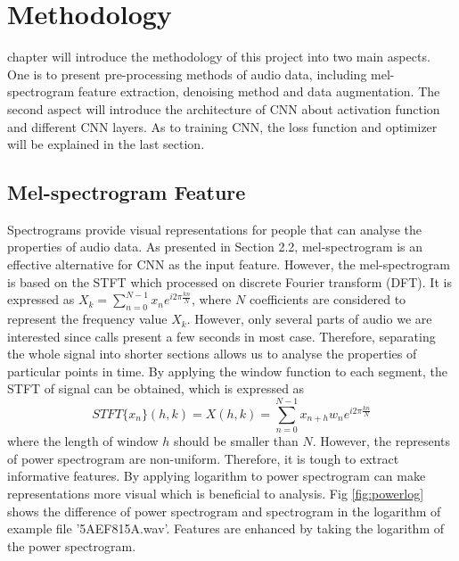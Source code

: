 \chapter{Methodology}
\renewcommand{\baselinestretch}{\mystretch}
\label{chap:method}
 chapter will introduce the methodology of this project into two main aspects. One is to present pre-processing methods of audio data, including mel-spectrogram feature extraction, denoising method and data augmentation. The second aspect will introduce the architecture of CNN about activation function and different CNN layers. As to training CNN, the loss function and optimizer will be explained in the last section. 

\section{Mel-spectrogram Feature}
Spectrograms provide visual representations for people that can analyse the properties of audio data. As presented in Section 2.2, mel-spectrogram is an effective alternative for CNN as the input feature. However, the mel-spectrogram is based on the STFT which processed on discrete Fourier transform (DFT). It is expressed as $X_k=\sum ^{N-1}_{n=0}x_ne^{i2\pi \frac{kn}{N}}$, where $N$ coefficients are considered to represent the frequency value $X_k$. However, only several parts of audio we are interested since calls present a few seconds in most case. Therefore, separating the whole signal into shorter sections allows us to analyse the properties of particular points in time. By applying the window function to each segment, the STFT of signal can be obtained, which is expressed as
\begin{equation}
STFT\{ x_n\}(h,k)=X(h,k)=\sum_{n=0}^{N-1}x_{n+h}w_ne^{i2\pi \frac{kn}{N}}
\end{equation} 
where the length of window $h$ should be smaller than $N$. However, the represents of power spectrogram are non-uniform. Therefore, it is tough to extract informative features. By applying logarithm to power spectrogram can make representations more visual which is beneficial to analysis. Fig \ref{fig:powerlog} shows the difference of power spectrogram and spectrogram in the logarithm of example file '5AEF815A.wav'. Features are enhanced by taking the logarithm of the power spectrogram.\par 
